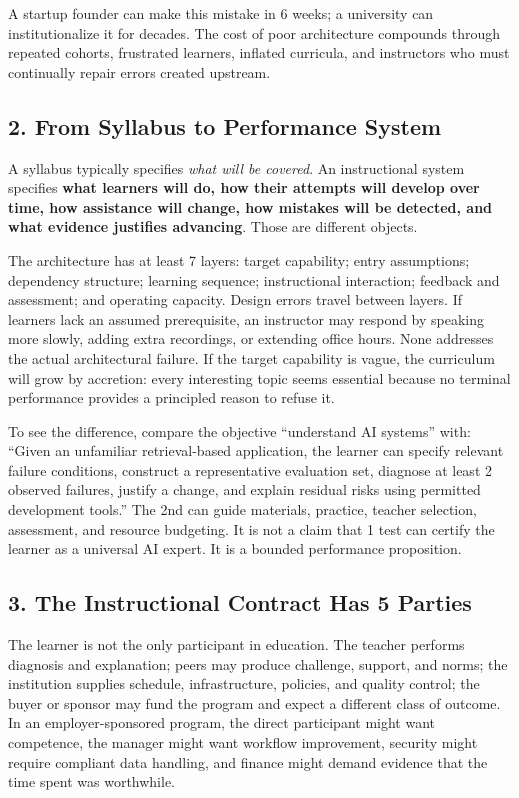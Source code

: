 A startup founder can make this mistake in 6 weeks; a university can institutionalize it for decades. The cost of poor architecture compounds through repeated cohorts, frustrated learners, inflated curricula, and instructors who must continually repair errors created upstream.

\subsection*{2. From Syllabus to Performance System}

A syllabus typically specifies \emph{what will be covered}. An instructional system specifies \textbf{what learners will do, how their attempts will develop over time, how assistance will change, how mistakes will be detected, and what evidence justifies advancing}. Those are different objects.

The architecture has at least 7 layers: target capability; entry assumptions; dependency structure; learning sequence; instructional interaction; feedback and assessment; and operating capacity. Design errors travel between layers. If learners lack an assumed prerequisite, an instructor may respond by speaking more slowly, adding extra recordings, or extending office hours. None addresses the actual architectural failure. If the target capability is vague, the curriculum will grow by accretion: every interesting topic seems essential because no terminal performance provides a principled reason to refuse it.

To see the difference, compare the objective ``understand AI systems'' with: ``Given an unfamiliar retrieval-based application, the learner can specify relevant failure conditions, construct a representative evaluation set, diagnose at least 2 observed failures, justify a change, and explain residual risks using permitted development tools.'' The 2nd can guide materials, practice, teacher selection, assessment, and resource budgeting. It is not a claim that 1 test can certify the learner as a universal AI expert. It is a bounded performance proposition.

\subsection*{3. The Instructional Contract Has 5 Parties}

The learner is not the only participant in education. The teacher performs diagnosis and explanation; peers may produce challenge, support, and norms; the institution supplies schedule, infrastructure, policies, and quality control; the buyer or sponsor may fund the program and expect a different class of outcome. In an employer-sponsored program, the direct participant might want competence, the manager might want workflow improvement, security might require compliant data handling, and finance might demand evidence that the time spent was worthwhile.

